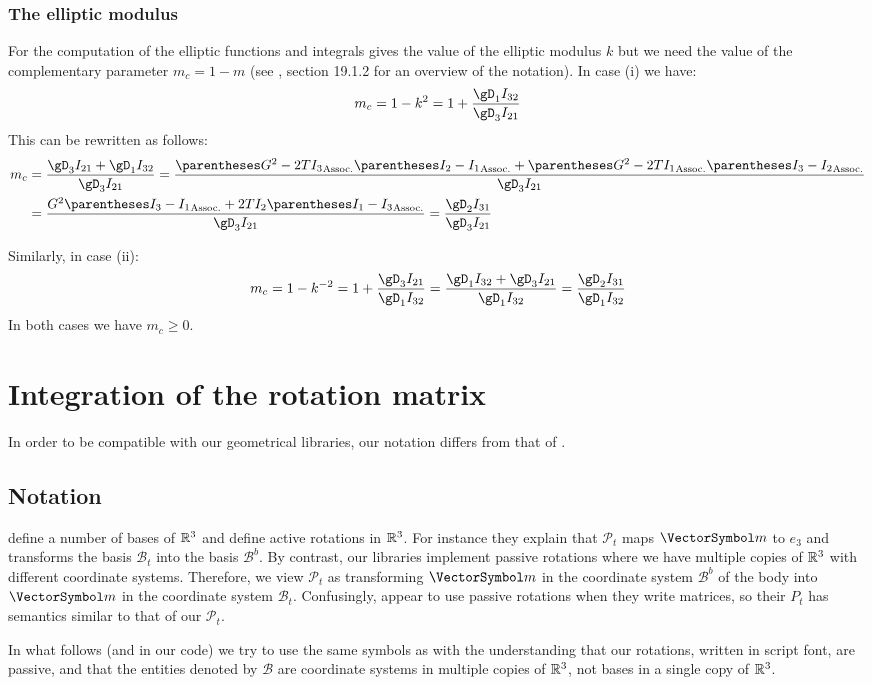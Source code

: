 \documentclass[10pt, a4paper, twoside]{basestyle}
\begin{document}
\subsubsection*{The elliptic modulus}
For the computation of the elliptic functions and integrals \cite{Celledoni2007} gives the value of the elliptic modulus $k$ but we need the value of
the complementary parameter $m_c = 1 - m$ (see \cite{NistHMF2010}, section 19.1.2 for an overview of the notation).  In case (i) we have:
\[
m_c = 1 - k^2 = 1 + \frac{\gD_1 I_{32}}{\gD_3 I_{21}}
\]
This can be rewritten as follows:
\begin{align*}
m_c &= \frac{\gD_3 I_{21} + \gD_1 I_{32}}{\gD_3 I_{21}}
=\frac{\pa{G^2 - 2 T I_3}\pa{I_2 - I_1} + \pa{G^2 - 2 T I_1}\pa{I_3 - I_2}}{\gD_3 I_{21}} \\
&=\frac{G^2\pa{I_3 - I_1} + 2 T I_2\pa{I_1 - I_3}}{\gD_3 I_{21}}
=\frac{\gD_2 I_{31}}{\gD_3 I_{21}}
\end{align*}

Similarly, in case (ii):
\[
m_c = 1 - k^{-2} = 1 + \frac{\gD_3 I_{21}}{\gD_1 I_{32}}
=\frac{\gD_1 I_{32} + \gD_3 I_{21}}{\gD_1 I_{32}}
=\frac{\gD_2 I_{31}}{\gD_1 I_{32}}
\]
In both cases we have $m_c \geq 0$.

\section*{Integration of the rotation matrix}
In order to be compatible with our geometrical libraries, our notation differs from that of \cite{Celledoni2007}.
\subsection*{Notation}
\cite{Celledoni2007} define a number of bases of $\mathbb{R}^3$ and define active rotations in $\mathbb{R}^3$.  For instance they explain that $\mathscr P_t$ maps $\vm$ to $e_3$ and transforms the basis $\mathscr B_t$ into the basis $\mathscr B^b$.  By contrast, our libraries implement passive rotations where we have multiple copies of $\mathbb{R}^3$ with different coordinate systems.  Therefore, we view $\mathscr P_t$ as transforming $\vm$ in the coordinate system $\mathscr B^b$ of the body into $\vm$ in the coordinate system $\mathscr B_t$.  Confusingly, \cite{Celledoni2007} appear to use passive
rotations when they write matrices, so their $P_t$ has semantics similar to that of our $\mathscr P_t$.

In what follows (and in our code) we try to use the same symbols as \cite{Celledoni2007} with the understanding that our rotations, written in
script font, are passive, and that the entities denoted by $\mathscr B$ are coordinate systems in multiple copies of $\mathbb{R}^3$, not bases in a 
single copy of $\mathbb{R}^3$.
\end{document}
